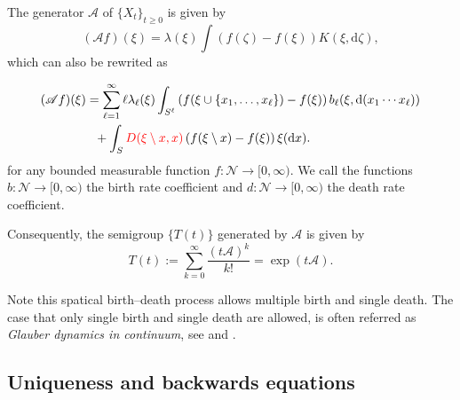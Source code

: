 \documentclass[12pt]{article}
\newcommand{\red}[1]{\textcolor{red}{#1}}
\newcounter{con}%
\numberwithin{equation}{section}
\begin{document}
The generator $\mathscr{A}$ of $\{X_t\}_{t\ge0}$ is given by
\begin{equation}
	(\mathscr{A}f)(\xi)=\lambda(\xi)\int(f(\zeta)-f(\xi))K(\xi,\mathrm{d}\zeta),
\end{equation}
which can also be rewrited as 

\begin{align}
	(\mathscr{A}f)(\xi)&=\sum_{\ell=1}^\infty \ell \lambda_\ell(\xi)\int_{S^\ell}\left(f(\xi\cup\{x_1,\dots,x_\ell\})-f(\xi)\right)b_\ell(\xi,\mathrm{d}(x_1\cdots x_\ell))\nonumber\\
			   &\ \	+\int_{S}\red{D(\xi\setminus x,x)}\left(f(\xi\setminus x)-f(\xi)\right)\xi(\mathrm{d}x).
\end{align}
for any bounded measurable function $f:\mathcal{N}\to[0,\infty)$.
We call the functions $b: \mathcal{N}\to[0,\infty)$ the birth rate coefficient and $d:\mathcal{N}\to[0,\infty)$ the death rate coefficient. 

Consequently, the semigroup $\{T(t)\}$ generated by $\mathscr{A}$ is given by 
\begin{equation}
	T(t):=\sum_{k=0}^{\infty}\frac{(t\mathscr{A})^k}{k!}=\exp(t\mathscr{A}).
\end{equation}

Note this spatical birth--death process allows multiple birth and single death. The case that only single birth and single death are allowed, is often referred as {\em Glauber dynamics in continuum}, see \cite{KL05} and \cite{moller03book}. 


\subsection{Uniqueness and backwards equations}
\end{document}
